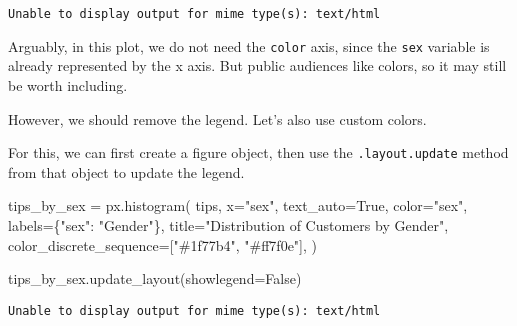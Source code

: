 \documentclass[
  letterpaper,
  DIV=11,
  numbers=noendperiod]{scrreprt}
\newenvironment{Shaded}{\begin{snugshade}}{\end{snugshade}}
\newcommand{\NormalTok}[1]{\textcolor[rgb]{0.00,0.23,0.31}{#1}}
\newcommand{\OperatorTok}[1]{\textcolor[rgb]{0.37,0.37,0.37}{#1}}
\newcommand{\StringTok}[1]{\textcolor[rgb]{0.13,0.47,0.30}{#1}}
\newcommand{\VariableTok}[1]{\textcolor[rgb]{0.07,0.07,0.07}{#1}}
\begin{document}
\begin{verbatim}
Unable to display output for mime type(s): text/html
\end{verbatim}

Arguably, in this plot, we do not need the \texttt{color} axis, since
the \texttt{sex} variable is already represented by the x axis. But
public audiences like colors, so it may still be worth including.

However, we should remove the legend. Let's also use custom colors.

For this, we can first create a figure object, then use the
\texttt{.layout.update} method from that object to update the legend.

\begin{Shaded}
\begin{Highlighting}[]
\NormalTok{tips\_by\_sex }\OperatorTok{=}\NormalTok{ px.histogram(}
\NormalTok{    tips,}
\NormalTok{    x}\OperatorTok{=}\StringTok{"sex"}\NormalTok{,}
\NormalTok{    text\_auto}\OperatorTok{=}\VariableTok{True}\NormalTok{,}
\NormalTok{    color}\OperatorTok{=}\StringTok{"sex"}\NormalTok{,}
\NormalTok{    labels}\OperatorTok{=}\NormalTok{\{}\StringTok{"sex"}\NormalTok{: }\StringTok{"Gender"}\NormalTok{\},}
\NormalTok{    title}\OperatorTok{=}\StringTok{"Distribution of Customers by Gender"}\NormalTok{,}
\NormalTok{    color\_discrete\_sequence}\OperatorTok{=}\NormalTok{[}\StringTok{"\#1f77b4"}\NormalTok{, }\StringTok{"\#ff7f0e"}\NormalTok{],}
\NormalTok{)}

\NormalTok{tips\_by\_sex.update\_layout(showlegend}\OperatorTok{=}\VariableTok{False}\NormalTok{)}
\end{Highlighting}
\end{Shaded}

\begin{verbatim}
Unable to display output for mime type(s): text/html
\end{verbatim}
\end{document}
